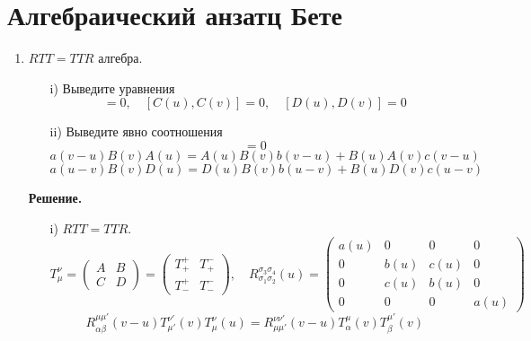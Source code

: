 \documentclass[12pt]{article}
\theoremstyle{definition}
\begin{document}
\section{Алгебраический анзатц Бете}
\begin{enumerate}
    \item $RTT=TTR$ алгебра.
    \begin{itemize}
        \item[i)] Выведите уравнения
        \begin{equation}
            [B(u),B(v)]=0,\quad [C(u),C(v)]=0,\quad [D(u),D(v)]=0
        \end{equation}
        \item[ii)] Выведите явно соотношения
        \begin{equation}
            [T(u),T(v)]=0
        \end{equation}
        \begin{equation}
            a(v-u)B(v)A(u)=A(u)B(v)b(v-u)+B(u)A(v)c(v-u)
        \end{equation}
        \begin{equation}
            a(u-v)B(v)D(u)=D(u)B(v)b(u-v)+B(u)D(v)c(u-v)
        \end{equation}
    \end{itemize}
    \textbf{Решение.}
    \begin{itemize}
        \item[i)] $RTT=TTR$.
        \begin{equation}
            T_\mu^\nu=\begin{pmatrix}
                A & B\\
                C & D
            \end{pmatrix}=\begin{pmatrix}
                T^+_+ & T^-_+\\
                T^+_- & T^-_-
            \end{pmatrix},\quad R^{\sigma_3\sigma_4}_{\sigma_1\sigma_2}(u)=\begin{pmatrix}
                a(u) & 0 & 0 & 0\\
                0 & b(u) & c(u) & 0\\
                0 & c(u) & b(u) & 0\\
                0 & 0 & 0 & a(u)
            \end{pmatrix}
        \end{equation}
        \begin{equation}
            R^{\mu\mu'}_{\alpha\beta}(v-u)T^{\nu'}_{\mu'}(v)T^\nu_\mu(u)=R^{\nu\nu'}_{\mu\mu'}(v-u)T^\mu_\alpha(v)T^{\mu'}_\beta(v)        

\end{equation}
\end{itemize}
\end{enumerate}
\end{document}
